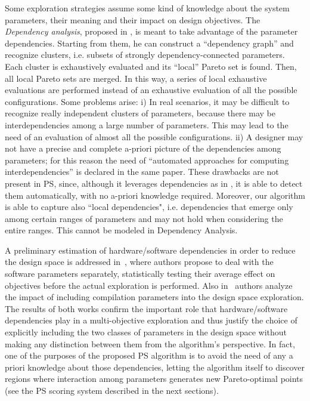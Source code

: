 Some exploration strategies assume some kind of knowledge about the
system parameters, their meaning and their impact on design
objectives.  The \emph{Dependency analysis}, proposed in
\cite{givargis_tvlsi02}, is meant to take advantage of the parameter
dependencies. Starting from them, he can construct a ``dependency graph''
and recognize clusters, i.e. subsets of strongly dependency-connected
parameters. Each cluster is exhaustively evaluated and its ``local''
Pareto set is found. Then, all local Pareto sets are merged. In this
way, a series of local exhaustive evaluations are performed instead of
an exhaustive evaluation of all the possible configurations. Some
problems arise: i) In real scenarios, it may be difficult to recognize
really independent clusters of parameters, because there may be
interdependencies among a large number of parameters. This may lead to
the need of an evaluation of almost all the possible configurations.
ii) A designer may not have a precise and complete a-priori picture of
the dependencies among parameters; for this reason the need of
``automated approaches for computing interdependencies'' is declared
in the same paper.  These drawbacks are not present in PS,
since, although it leverages dependencies as in
\cite{givargis_tvlsi02}, it is able to detect them automatically, with
no a-priori knowledge required. Moreover, our algorithm is able to
capture also ``local dependencies", i.e. dependencies that emerge only
among certain ranges of parameters and may not hold when considering
the entire ranges. This cannot be modeled in Dependency Analysis. 

A preliminary estimation of hardware/software dependencies in order to
reduce the design space is addressed in~\cite{Catania2008}, where
authors propose to deal with the software parameters separately,
statistically testing their average effect on objectives before the
actual exploration is performed. Also in~\cite{merging} authors
analyze the impact of including compilation parameters into the design
space exploration. The results of both works confirm the
important role that hardware/software dependencies play in a
multi-objective exploration and thus justify the choice of explicitly
including the two classes of parameters in the design space without
making any distinction between them from the algorithm's perspective.
In fact, one of the purposes of the proposed PS algorithm is to avoid
the need of any a priori knowledge about those dependencies, letting
the algorithm itself to discover regions where interaction among
parameters generates new Pareto-optimal points (see the PS scoring
system described in the next sections).

